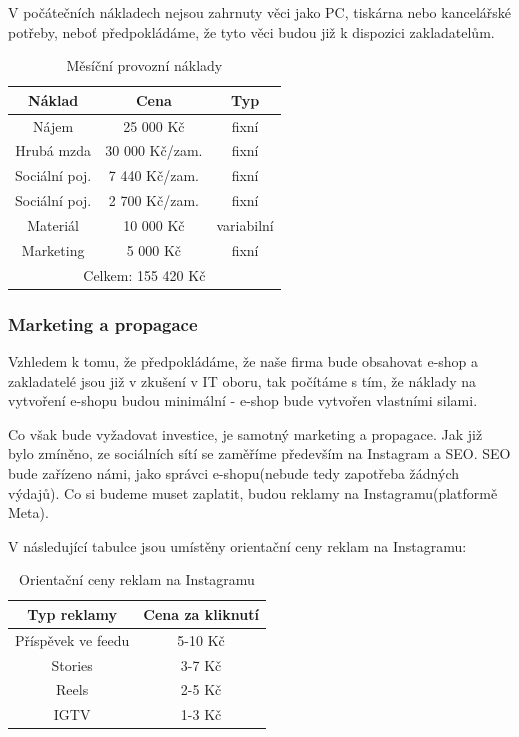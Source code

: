 \documentclass[12pt, a4paper]{article}
\begin{document}
\noindent V počátečních nákladech nejsou zahrnuty věci jako PC, tiskárna nebo kancelářské potřeby, neboť
předpokládáme, že tyto věci budou již k dispozici zakladatelům.

\begin{table}[h]
  \centering
  \begin{tabular}{ | c | c | c | }
    \hline
    \textbf{Náklad} & \textbf{Cena} & \textbf{Typ} \\
    \hline \hline
    Nájem & 25 000 Kč & fixní \\
    \hline
    Hrubá mzda & 30 000 Kč/zam. & fixní \\
    \hline
    Sociální poj. & 7 440 Kč/zam. & fixní \\
    \hline
    Sociální poj. & 2 700 Kč/zam. & fixní \\
    \hline
    Materiál & 10 000 Kč & variabilní \\
    \hline
    Marketing & 5 000 Kč & fixní \\
    \hline
    \multicolumn{3}{|c|}{Celkem: 155 420 Kč} \tabularnewline %
    \hline
  \end{tabular}
  \caption{Měsíční provozní náklady}
\end{table}

\subsubsection{Marketing a propagace}

Vzhledem k tomu, že předpokládáme, že naše firma bude obsahovat e-shop a
zakladatelé jsou již v zkušení v IT oboru, tak
počítáme s tím, že náklady na vytvoření e-shopu budou minimální - e-shop
bude vytvořen vlastními silami.

\vspace{10pt}
\noindent Co však bude vyžadovat investice, je samotný marketing a propagace.
Jak již bylo zmíněno, ze sociálních sítí se zaměříme především na Instagram a SEO.
SEO bude zařízeno námi, jako správci e-shopu(nebude tedy zapotřeba žádných výdajů). Co si budeme
muset zaplatit, budou reklamy na Instagramu(platformě Meta).

\noindent V následující tabulce jsou umístěny orientační ceny reklam na Instagramu:

\begin{table}[h]
  \centering
  \begin{tabular}{ |c|c| }
    \hline
    \textbf{Typ reklamy} & \textbf{Cena za kliknutí} \\
    \hline
    \hline
    Příspěvek ve feedu & 5-10 Kč \\
    \hline
    Stories & 3-7 Kč \\
    \hline
    Reels & 2-5 Kč \\
    \hline
    IGTV & 1-3 Kč \\
    \hline
  \end{tabular}
  \caption{Orientační ceny reklam na Instagramu \cite{reklamy-ig-zoomstudio}}
\end{table}
\end{document}
